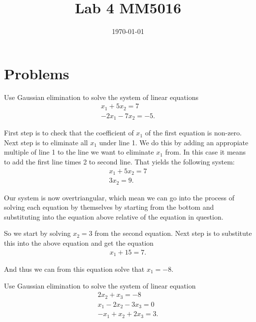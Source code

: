 \documentclass[10pt]{article}
\date{\today}
\title{Lab 4 MM5016}
\begin{document}
\maketitle


\section{Problems}
\label{sec:org281fdf0}

\begin{exercise}[System 1]  \label{exe:System_1}
Use Gaussian elimination to solve the system of linear equations
\begin{align*}
x_1 + 5x_2 = 7 \\
-2x_1 -7x_2 = -5
.
\end{align*}
\end{exercise}
\begin{solution}[]  \label{sol:}
First step is to check that the coefficient of \(x_1\) of the first
equation is non-zero.
Next step is to eliminate all \(x_1\) under line 1. We do this by
adding an appropiate multiple of line 1 to the line we
want to eliminate \(x_1\) from. In this case it means to add the first
line times 2 to second line. That yields the following system:
\begin{align*}
x_1 + 5x_2 = 7 \\
3x_2 = 9
.
\end{align*}

Our system is now overtriangular, which mean we can go into
the process of solving each equation by themselves by starting
from the bottom and substituting into the equation above
relative of the equation in question.


So we start by solving \(x_2 = 3\) from the second equation. Next step is
to substitute this into the above equation and get the equation
\begin{align*}
x_1 + 15 = 7
.
\end{align*}

And thus we can from this equation solve that \(x_1 = -8\).

\end{solution}
\begin{exercise}[System 2]  \label{exe:System_2}
Use Gaussian elimination to solve the system of linear equation
\begin{align*}
2x_2 + x_3 = -8 \\
x_1 - 2x_2 - 3x_3 = 0 \\
-x_1 + x_2 + 2x_3 = 3
.
\end{align*}
\end{exercise}
\end{document}
